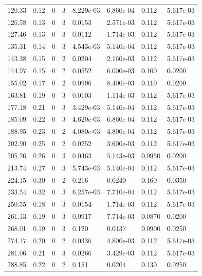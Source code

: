 \documentclass[preview]{standalone}
\begin{document}
{{\begin{tabular}{L{1.2cm}C{1.2cm} C{0.3cm}C{0.5cm} C{1.4cm}C{1.4cm} C{1.4cm}C{1.4cm}}
  120.33  &  0.12  & 0     &  3 &  8.229e-03  & 6.860e-04  & 0.112 &  5.617e-03   \\ 
  126.58  &  0.13  & 0     &  3 &  0.0153  & 2.571e-03  & 0.112 &  5.617e-03   \\ 
  127.46  &  0.13  & 0     &  3 &  0.0112  & 1.714e-03  & 0.112 &  5.617e-03   \\ 
  135.31  &  0.14  & 0     &  3 &  4.543e-03  & 5.140e-04  & 0.112 &  5.617e-03   \\ 
  143.38  &  0.15  & 0     &  2 &  0.0204  & 2.160e-03  & 0.112 &  5.617e-03   \\ 
  144.97  &  0.15  & 0     &  2 &  0.0552  & 6.000e-03  & 0.100 &  0.0200   \\ 
  155.02  &  0.17  & 0     &  2 &  0.0996  & 8.400e-03  & 0.110 &  0.0200   \\ 
  163.81  &  0.19  & 0     &  3 &  0.0103  & 1.114e-03  & 0.112 &  5.617e-03   \\ 
  177.18  &  0.21  & 0     &  3 &  3.429e-03  & 5.140e-04  & 0.112 &  5.617e-03   \\ 
  185.09  &  0.22  & 0     &  3 &  4.629e-03  & 6.860e-04  & 0.112 &  5.617e-03   \\ 
  188.95  &  0.23  & 0     &  2 &  4.080e-03  & 4.800e-04  & 0.112 &  5.617e-03   \\ 
  202.90  &  0.25  & 0     &  2 &  0.0252  & 3.600e-03  & 0.112 &  5.617e-03   \\ 
  205.26  &  0.26  & 0     &  3 &  0.0463  & 5.143e-03  & 0.0950 &  0.0200   \\ 
  213.74  &  0.27  & 0     &  3 &  5.743e-03  & 5.140e-04  & 0.112 &  5.617e-03   \\ 
  224.15  &  0.30  & 0     &  2 &  0.216  & 0.0240  & 0.160 &  0.0350   \\ 
  233.54  &  0.32  & 0     &  3 &  6.257e-03  & 7.710e-04  & 0.112 &  5.617e-03   \\ 
  250.55  &  0.18  & 0     &  3 &  0.0154  & 1.714e-03  & 0.112 &  5.617e-03   \\ 
  261.13  &  0.19  & 0     &  3 &  0.0917  & 7.714e-03  & 0.0870 &  0.0200   \\ 
  268.01  &  0.19  & 0     &  3 &  0.120  & 0.0137  & 0.0900 &  0.0250   \\ 
  274.17  &  0.20  & 0     &  2 &  0.0336  & 4.800e-03  & 0.112 &  5.617e-03   \\ 
  281.06  &  0.21  & 0     &  3 &  0.0266  & 3.429e-03  & 0.112 &  5.617e-03   \\ 
  288.85  &  0.22  & 0     &  2 &  0.151  & 0.0204  & 0.130 &  0.0250   \\ 

\end{tabular}}}
\end{document}
